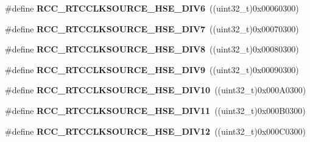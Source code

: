 \begin{DoxyCompactItemize}
\item 
\#define {\bfseries R\+C\+C\+\_\+\+R\+T\+C\+C\+L\+K\+S\+O\+U\+R\+C\+E\+\_\+\+H\+S\+E\+\_\+\+D\+I\+V6}~((uint32\+\_\+t)0x00060300)\hypertarget{group___r_c_c___r_t_c___clock___source_gae541538e57fdf779b8f16202416c799a}{}\label{group___r_c_c___r_t_c___clock___source_gae541538e57fdf779b8f16202416c799a}

\item 
\#define {\bfseries R\+C\+C\+\_\+\+R\+T\+C\+C\+L\+K\+S\+O\+U\+R\+C\+E\+\_\+\+H\+S\+E\+\_\+\+D\+I\+V7}~((uint32\+\_\+t)0x00070300)\hypertarget{group___r_c_c___r_t_c___clock___source_ga352febcf0ae6b14407f0e6aae66ffe11}{}\label{group___r_c_c___r_t_c___clock___source_ga352febcf0ae6b14407f0e6aae66ffe11}

\item 
\#define {\bfseries R\+C\+C\+\_\+\+R\+T\+C\+C\+L\+K\+S\+O\+U\+R\+C\+E\+\_\+\+H\+S\+E\+\_\+\+D\+I\+V8}~((uint32\+\_\+t)0x00080300)\hypertarget{group___r_c_c___r_t_c___clock___source_gaf4f0209bbf068b427617f380e8e42490}{}\label{group___r_c_c___r_t_c___clock___source_gaf4f0209bbf068b427617f380e8e42490}

\item 
\#define {\bfseries R\+C\+C\+\_\+\+R\+T\+C\+C\+L\+K\+S\+O\+U\+R\+C\+E\+\_\+\+H\+S\+E\+\_\+\+D\+I\+V9}~((uint32\+\_\+t)0x00090300)\hypertarget{group___r_c_c___r_t_c___clock___source_gafabded7bf1f0108152a9c2301fdbe251}{}\label{group___r_c_c___r_t_c___clock___source_gafabded7bf1f0108152a9c2301fdbe251}

\item 
\#define {\bfseries R\+C\+C\+\_\+\+R\+T\+C\+C\+L\+K\+S\+O\+U\+R\+C\+E\+\_\+\+H\+S\+E\+\_\+\+D\+I\+V10}~((uint32\+\_\+t)0x000\+A0300)\hypertarget{group___r_c_c___r_t_c___clock___source_gab53e5fbbd7510563393fde77cfdde411}{}\label{group___r_c_c___r_t_c___clock___source_gab53e5fbbd7510563393fde77cfdde411}

\item 
\#define {\bfseries R\+C\+C\+\_\+\+R\+T\+C\+C\+L\+K\+S\+O\+U\+R\+C\+E\+\_\+\+H\+S\+E\+\_\+\+D\+I\+V11}~((uint32\+\_\+t)0x000\+B0300)\hypertarget{group___r_c_c___r_t_c___clock___source_gae0ca4ffa1a26f99e377c56183ea68ec1}{}\label{group___r_c_c___r_t_c___clock___source_gae0ca4ffa1a26f99e377c56183ea68ec1}

\item 
\#define {\bfseries R\+C\+C\+\_\+\+R\+T\+C\+C\+L\+K\+S\+O\+U\+R\+C\+E\+\_\+\+H\+S\+E\+\_\+\+D\+I\+V12}~((uint32\+\_\+t)0x000\+C0300)\hypertarget{group___r_c_c___r_t_c___clock___source_ga06837111cb6294d55f681347514a233d}{}\label{group___r_c_c___r_t_c___clock___source_ga06837111cb6294d55f681347514a233d}


\end{DoxyCompactItemize}
